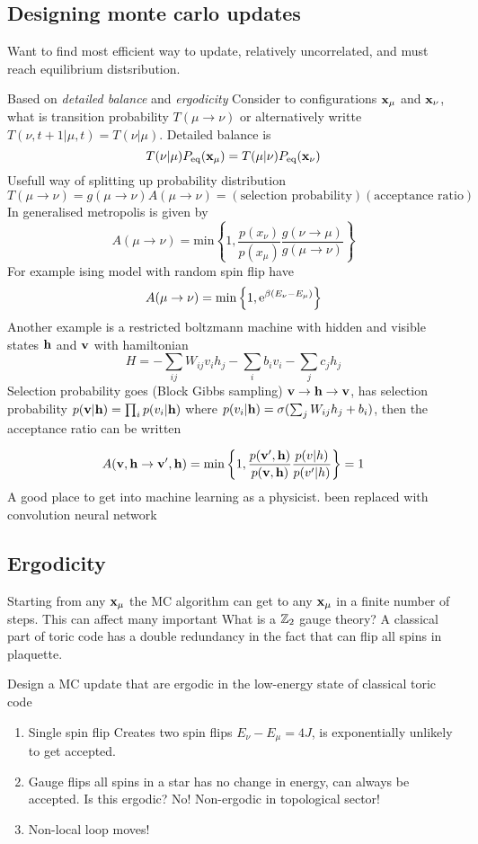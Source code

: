 \documentclass[a4paper]{article}
\begin{document}
\subsection{Designing monte carlo updates}
Want to find most efficient way to update, relatively uncorrelated, and must
reach equilibrium distsribution.
\begin{example}[Metropolis]
    Based on \emph{detailed balance} and \emph{ergodicity}
    Consider to configurations $\mathbf{x}_\mu$ and $\mathbf{x}_\nu$, what is transition
    probability $T(\mu\to\nu)$ or alternatively writte $T(\nu,
    t+1|\mu,t)=T(\nu|\mu)$.
    Detailed balance is
    \[ T(\nu|\mu)P_\mathrm{eq} (\mathbf x_\mu)=T(\mu|\nu)P_\mathrm{eq}(\mathbf x_\nu)\]
    Usefull way of splitting up probability distribution
    \[ T(\mu\to \nu)=g(\mu\to\nu)A(\mu\to \nu)=(\text{selection
    probability})(\text{acceptance ratio})\]
    In generalised metropolis is given by 
    \[ A(\mu\to\nu)=\mathrm{min}\left\{
    1,\frac{p(x_\nu)}{p(x_\mu)}\frac{g(\nu\to\mu)}{g(\mu\to \nu)}\right\}\]
    For example ising model with random spin flip have 
    \[ A(\mu\to \nu)=\mathrm{min}\left\{ 1,\mathrm{e}^{\beta(E_\nu-E_\mu)}\right\}\]
    Another example is a restricted boltzmann machine with hidden and visible
    states $\mathbf h$ and $\mathbf v$ with hamiltonian \[H=-\sum_{ij} W_{ij} v_ih_j
-\sum_i b_i v_i -\sum_j c_j h_j\]
Selection probability goes (Block Gibbs sampling) $\mathbf v\to\mathbf h\to \mathbf v$, has
selection probability $p(\mathbf v|\mathbf h)=\prod_ip(v_i|\mathbf h)$
where $p(v_i|\mathbf h)=\sigma(\sum_j W_{ij} h_j+b_i)$, then the acceptance ratio
can be written

\[A(\mathbf v,\mathbf h\to \mathbf v',\mathbf h)=\mathrm{min}\left\{ 1,\frac{p(\mathbf v',\mathbf
h)}{p(\mathbf v,\mathbf h)}\frac{p(v|h)}{p(v'|h)}\right\}=1\]
A good place to get into machine learning as a physicist. been replaced with
convolution neural network
\end{example}
\subsection{Ergodicity}
Starting from any $\mathbf x_\mu$ the MC algorithm can get to any $\mathbf x_\mu$ in
a finite number of steps. This can affect many important 
What is a $\mathbb{Z}_2$ gauge theory? A classical part of toric code has a double
redundancy in the fact that can flip all spins in plaquette.
\begin{exercise}
    Design a MC update that are ergodic in the low-energy state of classical
    toric code
    \begin{enumerate}
        \item Single spin flip Creates two spin flips  $E_\nu-E_\mu =4J$,
            is exponentially unlikely to get accepted.
        \item Gauge flips all spins in a star has no change in energy, can
            always be accepted. Is this ergodic? No! Non-ergodic in topological
            sector!
        \item Non-local loop moves! 
    \end{enumerate}
\end{exercise}
\end{document}
